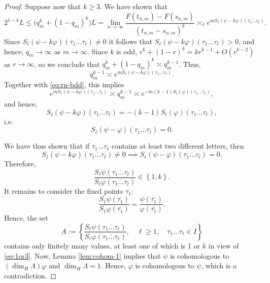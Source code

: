\documentclass[10pt,a4paper]{amsart}
\begin{document}
\begin{proof}
Suppose now that $k\geq 3$. We have shown that
\[
2^{1-k}L\le \big(q_{m}^k+(1-q_{m})^k\big)L= \lim_{n\to\infty}\frac{F(t_{n,m})-F(s_{n,m})}{(t_{n,m}-s_{n,m})^k} \asymp_{\ell} e^{mS_{\ell}\left(\psi-k\varphi\right)(\overline{\tau_{1}\dots \tau_{\ell}})}.
\]
Since $S_{\ell}(\psi-k\varphi)\left(\overline{\tau_{1}\dots \tau_{\ell}}\right)\neq0$
it follows that $S_{\ell}(\psi-k\varphi)\left(\overline{\tau_{1}\dots \tau_{\ell}}\right)>0$, and hence, $q_{m}\rightarrow\infty$ as $m\rightarrow\infty$.
Since $k$ is odd, $r^k+(1-r)^k=kr^{k-1}+O(r^{k-2})$ as $r\to\infty$, so we conclude that $q_m^k+(1-q_m)^k\asymp q_m^{k-1}$. Thus,
\[
q_{m}^{k-1}\asymp e^{mS_{\ell}\left(\psi-k\varphi\right)(\overline{\tau_{1}\dots \tau_{\ell}})}.
\]
Together with \eqref{eq:rn-bdd}, this implies
\[
e^{mS_{\ell}\left(\psi-k\varphi\right)(\overline{\tau_{1}\dots \tau_{\ell}})} \asymp q_m^{k-1} \asymp e^{-m(k-1)S_{\ell}\left(\varphi\right)(\overline{\tau_{1}\dots \tau_{\ell}})},
\]
and hence, 
\[
S_{\ell}\left(\psi-k\varphi\right)(\overline{\tau_{1}\dots \tau_{\ell}})=-(k-1)S_{\ell}\left(\varphi\right)(\overline{\tau_{1}\dots \tau_{\ell}}),
\]
i.e. 
\[
S_{\ell}\left(\psi-\varphi\right)(\overline{\tau_{1}\dots \tau_{\ell}})=0.
\]

We have thus shown that if $\tau_{1}\dots \tau_{\ell}$ contains at least two different letters, then 
\[
S_{\ell}\left(\psi-k\varphi\right)(\overline{\tau_{1}\dots \tau_{\ell}})\neq0\implies S_{\ell}\left(\psi-\varphi\right)(\overline{\tau_{1}\dots \tau_{\ell}})=0.
\]
Therefore, 
\begin{equation}
\label{eq:1or3}
\frac{S_{\ell}\psi\left(\overline{\tau_{1}\dots \tau_{\ell}}\right)}{S_{\ell}\varphi\left(\overline{\tau_{1}\dots \tau_{\ell}}\right)}\in\left\{ 1,k\right\} .
\end{equation}
It remains to consider the fixed points $\overline{\tau_1}$:
\[
\frac{S_{1}\psi\left(\overline{\tau_1}\right)}{S_{1}\varphi\left(\overline{\tau_1}\right)}=\frac{\psi\left(\overline{\tau_1}\right)}{\varphi\left(\overline{\tau_1}\right)}.
\]
Hence, the set
\[
A:=\left\{\frac{S_{\ell}\psi\left(\overline{\tau_{1}\dots \tau_{\ell}}\right)}{S_{\ell}\varphi\left(\overline{\tau_{1}\dots \tau_{\ell}}\right)},\quad \ell \ge 1,\quad \tau_1\dots \tau_\ell \in I \right\}
\]
contains only finitely many values, at least one of which is 1 or $k$ in view of \eqref{eq:1or3}. Now, Lemma \ref{lem:cohom-1} implies
that $\psi$ is cohomologous to $(\dim_{H}\Lambda)\varphi$ and  $\dim_{H}\Lambda=1$.
Hence, $\varphi$ is cohomologous to $\psi$, which is a contradiction. 
\end{proof}
\end{document}

